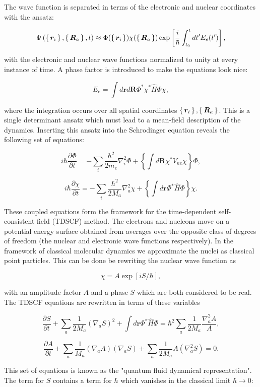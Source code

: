 The wave function is separated in terms of the electronic and nuclear
coordinates with the ansatz:

$$ \Psi \left(\set{\bm{r}_i}, \set{\bm{R}_a}, t \right)
    \approx \Phi(\set{\bm{r}_i}) \chi(\set{\bm{R}_a})
    \exp \left[ \frac{i}{\hbar} \int_{t_0}^t
    dt' E_e(t') \right] ,
$$

with the electronic and nuclear wave functions normalized to unity
at every instance of time. A phase factor is introduced to make
the equations look nice:

$$ E_e = \int d\bm{r} d\bm{R} \Phi^* \chi^* \hat{H} \Phi \chi , $$

where the integration occurs over all spatial coordinates
$\set{\bm{r}_i}, \set{\bm{R}_a}$. This is a single determinant
ansatz which must lead to a mean-field description of the dynamics.
Inserting this ansatz into the Schrodinger equation
reveals the following set of equations:

$$ i\hbar \frac{\partial \Phi}{\partial t}
    = -\sum_i \frac{\hbar^2}{2m_e} \nabla_i^2 \Phi
    + \left\{ \int d\bm{R} \chi^* V_{ne} \chi \right\} \Phi , $$

$$ i\hbar \frac{\partial \chi}{\partial t}
    = -\sum_i \frac{\hbar^2}{2M_a} \nabla_a^2 \chi
    + \left\{ \int d\bm{r} \Phi^* \hat{H} \Phi \right\} \chi . $$

These coupled equations form the framework for the
time-dependent self-consistent field (TDSCF) method.
The electrons and nucleons move on a potential energy surface
obtained from averages over the opposite class of
degrees of freedom (the nuclear and electronic wave functions
respectively).
In the framework of classical molecular dynamics
we approximate the nuclei as classical point particles.
This can be done be rewriting the nuclear wave function as

$$ \chi = A \exp[iS/\hbar] , $$

with an amplitude factor $A$ and a phase $S$
which are both considered to be real.
The TDSCF equations are rewritten in terms of these variables

$$ \frac{\partial S}{\partial t} + \sum_a \frac{1}{2M_a}
    (\nabla_a S)^2 + \int d\bm{r} \Phi^* \hat{H} \Phi
    = \hbar^2 \sum_a \frac{1}{2M_a} \frac{\nabla_a^2 A}{A} , $$

$$ \frac{\partial A}{\partial t} + \sum_a \frac{1}{M_a} (\nabla_a A)
    (\nabla_a S) + \sum_a \frac{1}{2M_a} A (\nabla_a^2 S) = 0 . $$

This set of equations is known as the "quantum fluid dynamical representation".
The term for $S$ contains a term for $\hbar$ which vanishes in
the classical limit $\hbar \rightarrow 0$:

